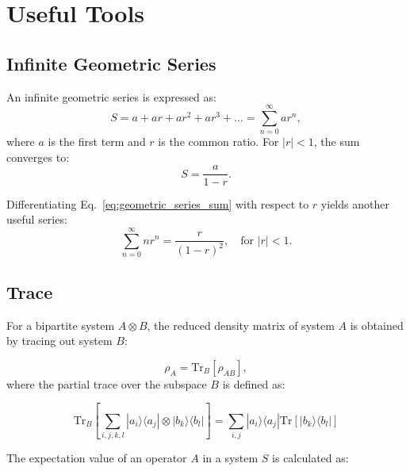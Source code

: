 \section{Useful Tools}

\subsection{Infinite Geometric Series}
An infinite geometric series is expressed as:
\begin{equation} \label{eq:infinite_geometric_series}
	S = a + ar + ar^2 + ar^3 + \dots = \sum_{n=0}^{\infty} ar^n,
\end{equation}
where \(a\) is the first term and \(r\) is the common ratio. For \(|r| < 1\), the sum converges to:
\begin{equation} \label{eq:geometric_series_sum}
	S = \frac{a}{1 - r}.
\end{equation}

Differentiating Eq.~\eqref{eq:geometric_series_sum} with respect to \( r \) yields another useful series:
\begin{equation} \label{eq:derivation_geometric_sum}
	\sum_{n=0}^{\infty} n r^n = \frac{r}{(1-r)^2}, \quad \text{for } |r| < 1.
\end{equation}


\subsection{Trace}
For a bipartite system \( A \otimes B \), the reduced density matrix of system \( A \) is obtained by tracing out system \( B \):

\begin{equation} \label{eq:partial_trace}
	\rho_A = \mathrm{Tr}_B[\rho_{AB}],
\end{equation}
where the partial trace over the subspace \( B \) is defined as:

\begin{equation} \label{eq:partial_trace_definition}
	\mathrm{Tr}_B\left[\sum_{i,j,k,l} | a_i \rangle \langle a_j | \otimes | b_k \rangle \langle b_l | \right] = \sum_{i,j} | a_i \rangle \langle a_j | \mathrm{Tr}\left[ | b_k \rangle \langle b_l | \right]
\end{equation}

The expectation value of an operator \( A \) in a system \( S \) is calculated as:

